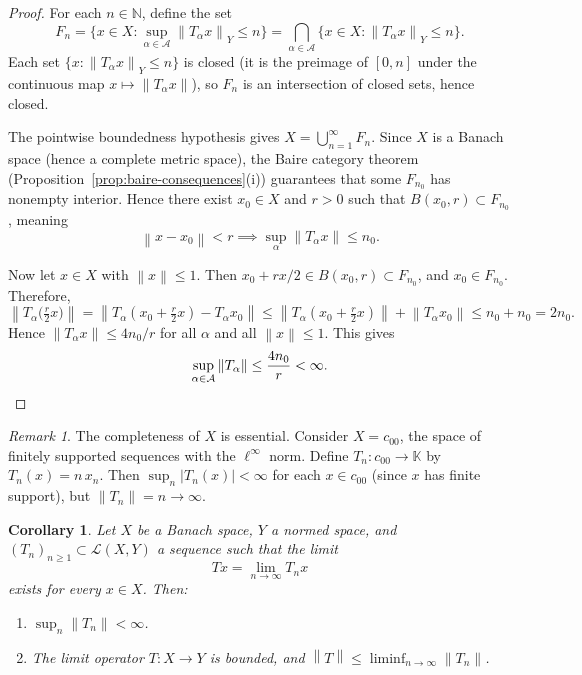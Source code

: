 \documentclass[a4paper,12pt]{book}
\newcommand{\N}{\mathbb{N}}
\newcommand{\K}{\mathbb{K}}
\newcommand{\norm}[1]{\left\| #1 \right\|}
\newcommand{\abs}[1]{\left| #1 \right|}
\theoremstyle{definition}
\theoremstyle{plain}
\newtheorem{corollary}[definition]{Corollary}
\theoremstyle{remark}
\newtheorem{remark}[definition]{Remark}
\begin{document}
\begin{proof}
For each $n \in \N$, define the set
\[
  F_n = \bigl\{ x \in X : \sup_{\alpha \in \mathcal{A}} \norm{T_\alpha x}_Y
  \leq n \bigr\}
  = \bigcap_{\alpha \in \mathcal{A}} \{ x \in X : \norm{T_\alpha x}_Y \leq n \}.
\]
Each set $\{x : \norm{T_\alpha x}_Y \leq n\}$ is closed (it is the preimage of
$[0,n]$ under the continuous map $x \mapsto \norm{T_\alpha x}$), so $F_n$ is an
intersection of closed sets, hence closed.

The pointwise boundedness hypothesis gives $X = \bigcup_{n=1}^{\infty} F_n$.
Since $X$ is a Banach space (hence a complete metric space), the Baire category
theorem (Proposition~\ref{prop:baire-consequences}(i)) guarantees that some $F_{n_0}$
has nonempty interior. Hence there exist $x_0 \in X$ and $r > 0$ such that
$B(x_0, r) \subset F_{n_0}$, meaning
\[
  \norm{x - x_0} < r \implies \sup_{\alpha} \norm{T_\alpha x} \leq n_0.
\]

Now let $x \in X$ with $\norm{x} \leq 1$. Then $x_0 + rx/2 \in B(x_0, r)
\subset F_{n_0}$, and $x_0 \in F_{n_0}$. Therefore,
\[
  \norm{T_\alpha\!\bigl(\tfrac{r}{2} x\bigr)}
  = \norm{T_\alpha(x_0 + \tfrac{r}{2}x) - T_\alpha x_0}
  \leq \norm{T_\alpha(x_0 + \tfrac{r}{2}x)} + \norm{T_\alpha x_0}
  \leq n_0 + n_0 = 2n_0.
\]
Hence $\norm{T_\alpha x} \leq 4n_0/r$ for all $\alpha$ and all $\norm{x} \leq 1$.
This gives
\[
  \sup_{\alpha \in \mathcal{A}} \norm{T_\alpha} \leq \frac{4 n_0}{r} < \infty.
  \qedhere
\]
\end{proof}

\begin{remark}\label{rem:ubp-completeness-necessary}
The completeness of $X$ is essential. Consider $X = c_{00}$, the space of finitely
supported sequences with the $\ell^\infty$ norm. Define $T_n \colon c_{00} \to \K$ by
$T_n(x) = n\, x_n$. Then $\sup_n \abs{T_n(x)} < \infty$ for each $x \in c_{00}$
(since $x$ has finite support), but $\norm{T_n} = n \to \infty$.
\end{remark}

\begin{corollary}\label{cor:ubp-pointwise-limit}
Let $X$ be a Banach space, $Y$ a normed space, and $(T_n)_{n \geq 1} \subset
\mathcal{L}(X,Y)$ a sequence such that the limit
\[
  Tx = \lim_{n \to \infty} T_n x
\]
exists for every $x \in X$. Then:
\begin{enumerate}[label=(\roman*)]
  \item $\sup_n \norm{T_n} < \infty$.
  \item The limit operator $T \colon X \to Y$ is bounded, and
    $\norm{T} \leq \liminf_{n\to\infty} \norm{T_n}$.
\end{enumerate}
\end{corollary}
\end{document}

